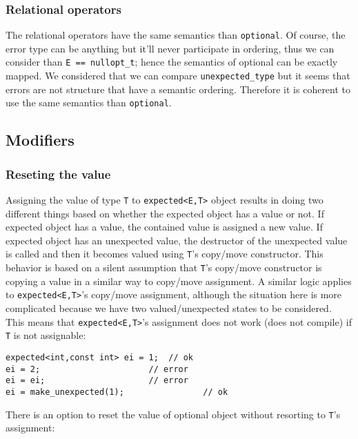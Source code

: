 \documentclass[a4paper,10pt]{article}
\newcommand{\cpp}[1]{\lstinline{#1}}
\begin{document}
\subsubsection{Relational operators}

The relational operators have the same semantics than \cpp{optional}\cite{OptionalRev5}. Of course, the error type can be anything but it'll never participate in ordering, thus we can consider than \cpp{E == nullopt_t}; hence the semantics of optional can be exactly mapped. We considered that we can compare \cpp{unexpected_type} but it seems that errors are not structure that have a semantic ordering. Therefore it is coherent to use the same semantics than \cpp{optional}.

\subsection{Modifiers}

\subsubsection{Reseting the value}

Assigning the value of type \cpp{T} to \cpp{expected<E,T>} object results in doing two different things based on whether the expected object has a value or not. If expected object has a value, the contained value is assigned a new value. If expected object has an unexpected value, the destructor of the unexpected value is called and then it becomes valued using \cpp{T}'s copy/move constructor. This behavior is based on a silent assumption that \cpp{T}'s copy/move constructor is copying a value in a similar way to copy/move assignment. A similar logic applies to \cpp{expected<E,T>}'s copy/move assignment, although the situation here is more complicated because we have two valued/unexpected states to be considered. This means that \cpp{expected<E,T>}'s assignment does not work (does not compile) if \cpp{T} is not assignable:

\begin{lstlisting}
expected<int,const int> ei = 1;  // ok
ei = 2;                      // error 
ei = ei;                     // error 
ei = make_unexpected(1);                // ok
\end{lstlisting}

There is an option to reset the value of optional object without resorting to \cpp{T}'s assignment:
\end{document}
